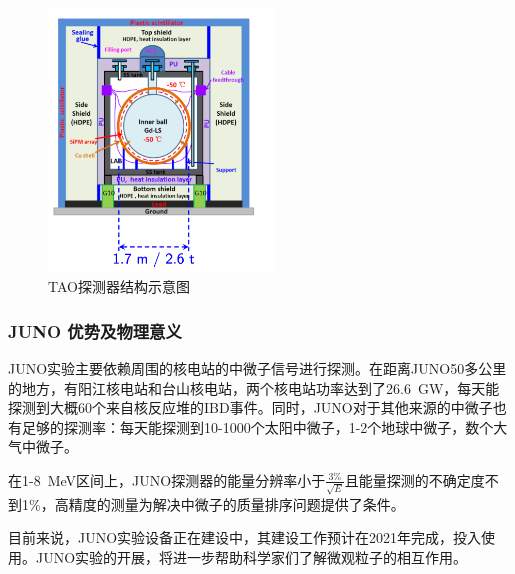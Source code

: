 \documentclass[10pt,a4paper]{article}
\begin{document}
\begin{figure}[H]
 \centering
 \includegraphics[height=7cm]{images/TAO探测器示意图.png}
 \caption{TAO探测器结构示意图}
 \label{fig:40}
\end{figure}



\subsubsection{JUNO 优势及物理意义}\label{sub:10}

JUNO实验主要依赖周围的核电站的中微子信号进行探测。在距离JUNO50多公里的地方，有阳江核电站和台山核电站，两个核电站功率达到了\SI{26.6}{GW}，每天能探测到大概60个来自核反应堆的IBD事件。同时，JUNO对于其他来源的中微子也有足够的探测率：每天能探测到10-1000个太阳中微子，1-2个地球中微子，数个大气中微子。

在1-\SI{8 }{MeV}区间上，JUNO探测器的能量分辨率小于$\frac{3\%}{\sqrt{E}}$且能量探测的不确定度不到1\%，高精度的测量为解决中微子的质量排序问题提供了条件。

目前来说，JUNO实验设备正在建设中，其建设工作预计在2021年完成，投入使用。JUNO实验的开展，将进一步帮助科学家们了解微观粒子的相互作用。

\newpage



\end{document}
